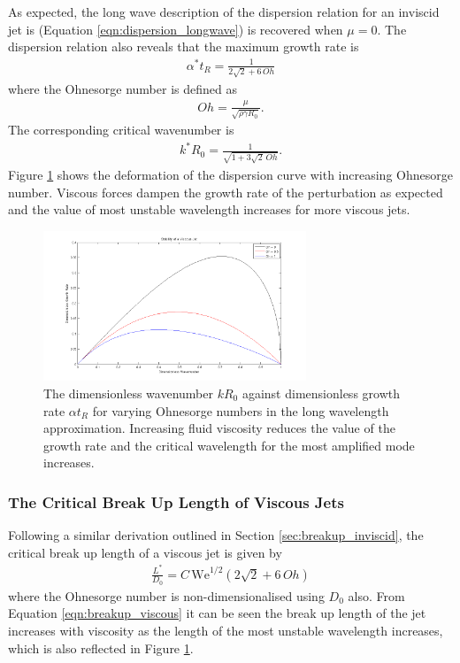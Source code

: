 \documentclass[11pt]{article}
\begin{document}
As expected, the long wave description of the dispersion relation for an 
inviscid jet is  (Equation \ref{eqn:dispersion_longwave}) is recovered when 
$\mu =0$. The dispersion relation also reveals that the maximum growth rate is 
\begin{align}
\alpha^*t_R = \frac{1}{2 \sqrt{2} + 6 \, Oh}
\label{eqn:visc_max_growth}
\end{align}
where the Ohnesorge number is defined as
\begin{align}
Oh = \frac{\mu}{\sqrt{\rho \gamma R_0}}.
\end{align}
The corresponding critical wavenumber is
\begin{align}
k^*R_0 = \frac{1}{\sqrt{1+ 3\sqrt{2} \, Oh}}.
\end{align}
Figure \ref{fig:dispersion_viscous} shows the deformation of the dispersion 
curve with increasing Ohnesorge number. Viscous forces dampen the growth rate 
of the perturbation as expected and the value of most unstable wavelength 
increases for more viscous jets.
\begin{figure}[ht]
\begin{center}
	\includegraphics[width = 0.7\textwidth]{img/dispersion_comparison_viscous.png}
	\caption{The dimensionless wavenumber $kR_0$ against dimensionless growth 
rate $\alpha t_R$ for varying Ohnesorge numbers in the long wavelength 
approximation. Increasing fluid viscosity reduces the value of the growth rate 
and the critical wavelength for the most amplified mode increases.}
	\label{fig:dispersion_viscous}
\end{center}
\end{figure}

\subsubsection{The Critical Break Up Length of Viscous Jets} \label{sec:breakup_length}
Following a similar derivation outlined in Section \ref{sec:breakup_inviscid}, 
the critical break up length of a viscous jet is given by
\begin{align}
\frac{L^*}{D_0} = C \, \mathrm{We}^{1/2}(2 \sqrt{2} + 6 \, Oh)
\label{eqn:breakup_viscous}
\end{align}
where the Ohnesorge number is non-dimensionalised using $D_0$ also. From 
Equation \ref{eqn:breakup_viscous} it can be seen the break up length of the 
jet increases with viscosity as the length of the most unstable wavelength 
increases, which is also reflected in Figure \ref{fig:dispersion_viscous}.
\end{document}
